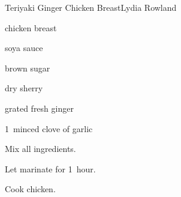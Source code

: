 \begin{recipe}{Teriyaki Ginger Chicken Breast}{Lydia Rowland}{}

\begin{ingredients}
\item {} chicken breast
\item {} soya sauce
\item {} brown sugar
\item {} dry sherry
\item \tp{\half} grated fresh ginger
\item 1~minced clove of garlic
\end{ingredients}

\begin{directions}
\item Mix all ingredients.
\item Let marinate for 1~hour.
\item Cook chicken.
\end{directions}

\end{recipe}
